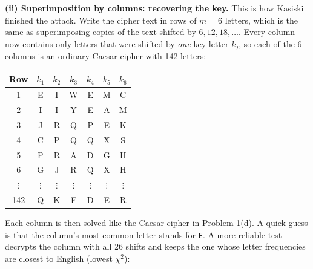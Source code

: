 \documentclass[a4paper, 10pt]{article}
\begin{document}
\begin{problem}
\begin{subproblems_alpha}
\begin{solution}
		      \textbf{(ii) Superimposition by columns: recovering the key.}
		      This is how Kasiski finished the attack.
		      Write the cipher text in rows of $m = 6$ letters, which is the same as superimposing copies of the text shifted by $6, 12, 18, \ldots$.
		      Every column now contains only letters that were shifted by \emph{one} key letter $k_j$,
		      so each of the 6 columns is an ordinary Caesar cipher with 142 letters:
		      \begin{center}
			      \footnotesize
			      \begin{tabular}{c|>{\ttfamily}c>{\ttfamily}c>{\ttfamily}c>{\ttfamily}c>{\ttfamily}c>{\ttfamily}c}
				      Row      & \normalfont$k_1$ & \normalfont$k_2$ & \normalfont$k_3$ & \normalfont$k_4$ & \normalfont$k_5$ & \normalfont$k_6$ \\
				      \hline
				      1        & E                & I                & W                & E                & M                & C                \\
				      2        & I                & I                & Y                & E                & A                & M                \\
				      3        & J                & R                & Q                & P                & E                & K                \\
				      4        & C                & P                & Q                & Q                & X                & S                \\
				      5        & P                & R                & A                & D                & G                & H                \\
				      6        & G                & J                & R                & Q                & X                & H                \\
				      $\vdots$ & $\vdots$         & $\vdots$         & $\vdots$         & $\vdots$         & $\vdots$         & $\vdots$         \\
				      142      & Q                & K                & F                & D                & E                & R                \\
			      \end{tabular}
		      \end{center}
		      Each column is then solved like the Caesar cipher in Problem 1(d).
		      A quick guess is that the column's most common letter stands for \texttt{E}.
		      A more reliable test decrypts the column with all 26 shifts and keeps the one whose letter frequencies are closest to English (lowest $\chi^2$):

\end{solution}
\end{subproblems_alpha}
\end{problem}
\end{document}
